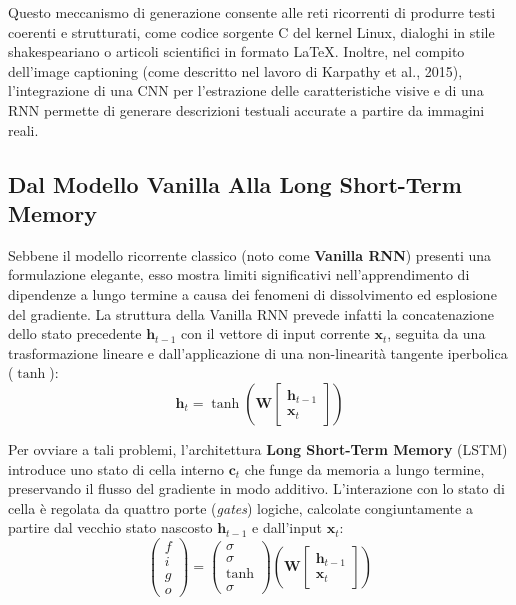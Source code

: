 ﻿\documentclass[11pt, a4paper]{article}
\begin{document}


Questo meccanismo di generazione consente alle reti ricorrenti di produrre testi coerenti e strutturati, come codice sorgente C del kernel Linux, dialoghi in stile shakespeariano o articoli scientifici in formato LaTeX. Inoltre, nel compito dell'image captioning (come descritto nel lavoro di Karpathy et al., 2015), l'integrazione di una CNN per l'estrazione delle caratteristiche visive e di una RNN permette di generare descrizioni testuali accurate a partire da immagini reali.

\subsection{Dal Modello Vanilla Alla Long Short-Term Memory}

Sebbene il modello ricorrente classico (noto come \textbf{Vanilla RNN}) presenti una formulazione elegante, esso mostra limiti significativi nell'apprendimento di dipendenze a lungo termine a causa dei fenomeni di dissolvimento ed esplosione del gradiente. La struttura della Vanilla RNN prevede infatti la concatenazione dello stato precedente $\bm{h}_{t-1}$ con il vettore di input corrente $\bm{x}_t$, seguita da una trasformazione lineare e dall'applicazione di una non-linearità tangente iperbolica ($\tanh$):
\[
\bm{h}_t = \tanh\left(\bm{W} \begin{bmatrix} \bm{h}_{t-1} \\ \bm{x}_t \end{bmatrix}\right)
\]


Per ovviare a tali problemi, l'architettura \textbf{Long Short-Term Memory} (LSTM) introduce uno stato di cella interno $\bm{c}_t$ che funge da memoria a lungo termine, preservando il flusso del gradiente in modo additivo. L'interazione con lo stato di cella è regolata da quattro porte (\emph{gates}) logiche, calcolate congiuntamente a partire dal vecchio stato nascosto $\bm{h}_{t-1}$ e dall'input $\bm{x}_t$:
\[
\begin{pmatrix} f \\ i \\ g \\ o \end{pmatrix} = \begin{pmatrix} \sigma \\ \sigma \\ \tanh \\ \sigma \end{pmatrix} \left( \bm{W} \begin{bmatrix} \bm{h}_{t-1} \\ \bm{x}_t \end{bmatrix} \right)
\]
\end{document}
